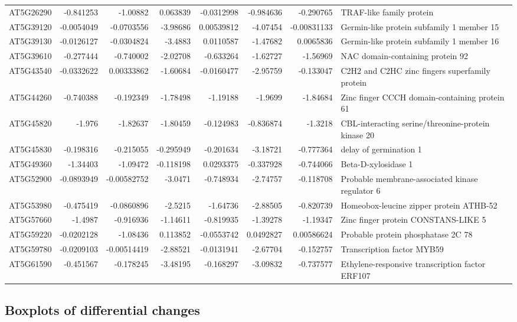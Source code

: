 \documentclass[11pt]{article}
\begin{document}
\begin{center}
\begin{tabular}{lrrrrrrl}
AT5G26290 & -0.841253 & -1.00882 & 0.063839 & -0.0312998 & -0.984636 & -0.290765 & TRAF-like family protein\\
AT5G39120 & -0.0054049 & -0.0703556 & -3.98686 & 0.00539812 & -4.07454 & -0.00831133 & Germin-like protein subfamily 1 member 15\\
AT5G39130 & -0.0126127 & -0.0304824 & -3.4883 & 0.0110587 & -1.47682 & 0.0065836 & Germin-like protein subfamily 1 member 16\\
AT5G39610 & -0.277444 & -0.740002 & -2.02708 & -0.633264 & -1.62727 & -1.56969 & NAC domain-containing protein 92\\
AT5G43540 & -0.0332622 & 0.00333862 & -1.60684 & -0.0160477 & -2.95759 & -0.133047 & C2H2 and C2HC zinc fingers superfamily protein\\
AT5G44260 & -0.740388 & -0.192349 & -1.78498 & -1.19188 & -1.9699 & -1.84684 & Zinc finger CCCH domain-containing protein 61\\
AT5G45820 & -1.976 & -1.82637 & -1.80459 & -0.124983 & -0.836874 & -1.3218 & CBL-interacting serine/threonine-protein kinase 20\\
AT5G45830 & -0.198316 & -0.215055 & -0.295949 & -0.201634 & -3.18721 & -0.777364 & delay of germination 1\\
AT5G49360 & -1.34403 & -1.09472 & -0.118198 & 0.0293375 & -0.337928 & -0.744066 & Beta-D-xylosidase 1\\
AT5G52900 & -0.0893949 & -0.00582752 & -3.0471 & -0.748934 & -2.74757 & -0.118708 & Probable membrane-associated kinase regulator 6\\
AT5G53980 & -0.475419 & -0.0860896 & -2.5215 & -1.64736 & -2.88505 & -0.820739 & Homeobox-leucine zipper protein ATHB-52\\
AT5G57660 & -1.4987 & -0.916936 & -1.14611 & -0.819935 & -1.39278 & -1.19347 & Zinc finger protein CONSTANS-LIKE 5\\
AT5G59220 & -0.0202128 & -1.08436 & 0.113852 & -0.0553742 & 0.0492827 & 0.00586624 & Probable protein phosphatase 2C 78\\
AT5G59780 & -0.0209103 & -0.00514419 & -2.88521 & -0.0131941 & -2.67704 & -0.152757 & Transcription factor MYB59\\
AT5G61590 & -0.451567 & -0.178245 & -3.48195 & -0.168297 & -3.09832 & -0.737577 & Ethylene-responsive transcription factor ERF107\\
\end{tabular}
\end{center}


\subsection{Boxplots of differential changes}
\label{sec:org39d3f86}
\end{document}
